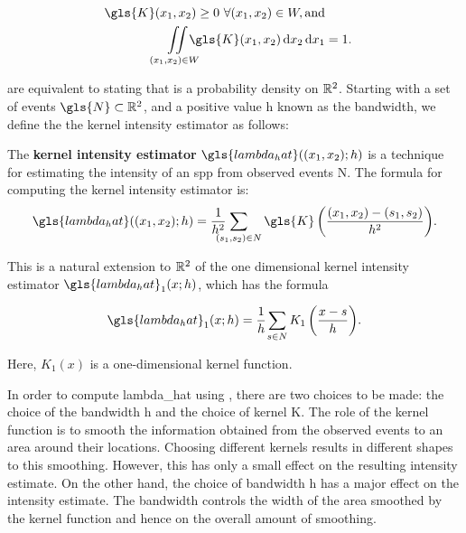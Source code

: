 \begin{align}
    \gls{K}\xvec \ge 0~ \forall \xvec \in W, \text{and} \label{eq:k_pos} \\
    \iintW{\gls{K}\xvec} & = 1 \label{eq:k_1} \text{.}
\end{align}

 are equivalent to stating that \Kdots is a probability density on $\mathbb{R}^2$.
Starting with a set of \glspl{event} $\gls{N} \subset \RS$,
and a positive value \gls{h} known as the bandwidth,
we define the the \gls{kernel intensity estimator} as follows:

\begin{defn}
    \label{defn:lambda_hat}
    The \textbf{\gls{kernel intensity estimator}} $\gls{lambda_hat}(\xvec;h)$
    is a technique for estimating the \gls{intensity} of an \gls{spp}
    from observed \glspl{event} \gls{N}.
    The formula for computing the \gls{kernel intensity estimator} is:
    \begin{equation}
        \label{eq:lambda_hat}
        \gls{lambda_hat}(\xvec; h) 
            = \sumS{\gls{K}\left(\frac{\xvec-(s_1, s_2)}{h^2}\right)} \text{.}%
    \end{equation}
\end{defn}

This is a natural extension to $\mathbb{R}^2$ of the one dimensional \gls{kernel intensity estimator} $\gls{lambda_hat}_1(x;h)$,
which has the formula

\begin{equation}
    \label{eq:lambda_hat_1}
    \gls{lambda_hat}_1(x;h) = \sumSone{K_1\left(\frac{x - s}{h}\right)} \text{.}%
\end{equation}

Here, $K_1(x)$ is a one-dimensional kernel function.

In order to compute \gls{lambda_hat} using ,
there are two choices to be made: the choice of the bandwidth \gls{h}
and the choice of \gls{kernel} \gls{K}.
The role of the \gls{kernel} function \Kdots is to smooth the information obtained
from the observed \glspl{event} to an area around their locations.
Choosing different \glspl{kernel} results in different shapes to this smoothing.
However, this has only a small effect on the resulting \gls{intensity} estimate.
On the other hand,
the choice of bandwidth \gls{h} has a major effect on the \gls{intensity} estimate.
The bandwidth controls the width of the area smoothed by the \gls{kernel} function and hence on the overall amount of smoothing.

